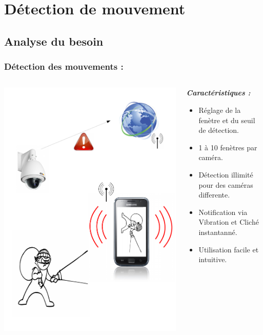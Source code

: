 
\section{Détection de mouvement}
 \subsection{Analyse du besoin}
  \begin{frame}
   \frametitle{Détection des mouvements :}



\begin{columns}
\begin{column}{5cm}

   \includegraphics[scale=0.25]{Images/ImageSlide10.pdf}
\end{column}
\begin{column}{7cm}
\textbf{\textit{Caractéristiques :}} 
\begin{itemize}
    \item Réglage de la fenètre et du seuil de détection.
  	\item 1 à 10 fenètres par caméra.
  	\item Détection illimité pour des caméras differente.
 	\item Notification via Vibration et Cliché instantanné.
 	\item Utilisation facile et intuitive.
\end{itemize}
\end{column}
\end{columns}
  \end{frame}
